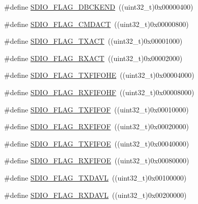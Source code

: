 \begin{DoxyCompactItemize}
\item 
\#define \mbox{\hyperlink{group___s_d_i_o___flags_ga5452d8033567821709bd7d5f06547b70}{S\+D\+I\+O\+\_\+\+F\+L\+A\+G\+\_\+\+D\+B\+C\+K\+E\+ND}}~((uint32\+\_\+t)0x00000400)
\item 
\#define \mbox{\hyperlink{group___s_d_i_o___flags_gad12a9b2bd30e7b907cbabfd92fc645b3}{S\+D\+I\+O\+\_\+\+F\+L\+A\+G\+\_\+\+C\+M\+D\+A\+CT}}~((uint32\+\_\+t)0x00000800)
\item 
\#define \mbox{\hyperlink{group___s_d_i_o___flags_gad5d075c98012586b169ec131aab2eeb5}{S\+D\+I\+O\+\_\+\+F\+L\+A\+G\+\_\+\+T\+X\+A\+CT}}~((uint32\+\_\+t)0x00001000)
\item 
\#define \mbox{\hyperlink{group___s_d_i_o___flags_gacc935dd830338970890a05922dff8ab7}{S\+D\+I\+O\+\_\+\+F\+L\+A\+G\+\_\+\+R\+X\+A\+CT}}~((uint32\+\_\+t)0x00002000)
\item 
\#define \mbox{\hyperlink{group___s_d_i_o___flags_gae9277461d3c8984dc31af318e2df1959}{S\+D\+I\+O\+\_\+\+F\+L\+A\+G\+\_\+\+T\+X\+F\+I\+F\+O\+HE}}~((uint32\+\_\+t)0x00004000)
\item 
\#define \mbox{\hyperlink{group___s_d_i_o___flags_ga8c5942ae3df21efad2d7c61a46015758}{S\+D\+I\+O\+\_\+\+F\+L\+A\+G\+\_\+\+R\+X\+F\+I\+F\+O\+HF}}~((uint32\+\_\+t)0x00008000)
\item 
\#define \mbox{\hyperlink{group___s_d_i_o___flags_gad3ca936300ef251639a4cfbe2f63b6b8}{S\+D\+I\+O\+\_\+\+F\+L\+A\+G\+\_\+\+T\+X\+F\+I\+F\+OF}}~((uint32\+\_\+t)0x00010000)
\item 
\#define \mbox{\hyperlink{group___s_d_i_o___flags_gaf92cb783f000b8d946fe8ace81b51df2}{S\+D\+I\+O\+\_\+\+F\+L\+A\+G\+\_\+\+R\+X\+F\+I\+F\+OF}}~((uint32\+\_\+t)0x00020000)
\item 
\#define \mbox{\hyperlink{group___s_d_i_o___flags_gac41ef05773abad79b4b0c443a77733db}{S\+D\+I\+O\+\_\+\+F\+L\+A\+G\+\_\+\+T\+X\+F\+I\+F\+OE}}~((uint32\+\_\+t)0x00040000)
\item 
\#define \mbox{\hyperlink{group___s_d_i_o___flags_ga59ea7e2dc22df742053c5e525b98599d}{S\+D\+I\+O\+\_\+\+F\+L\+A\+G\+\_\+\+R\+X\+F\+I\+F\+OE}}~((uint32\+\_\+t)0x00080000)
\item 
\#define \mbox{\hyperlink{group___s_d_i_o___flags_ga9c6620d6b16b6af19d3e14f40e688631}{S\+D\+I\+O\+\_\+\+F\+L\+A\+G\+\_\+\+T\+X\+D\+A\+VL}}~((uint32\+\_\+t)0x00100000)
\item 
\#define \mbox{\hyperlink{group___s_d_i_o___flags_ga7558b354658171bb6aa1b6f1e16d8e21}{S\+D\+I\+O\+\_\+\+F\+L\+A\+G\+\_\+\+R\+X\+D\+A\+VL}}~((uint32\+\_\+t)0x00200000)
\item 

\end{DoxyCompactItemize}
